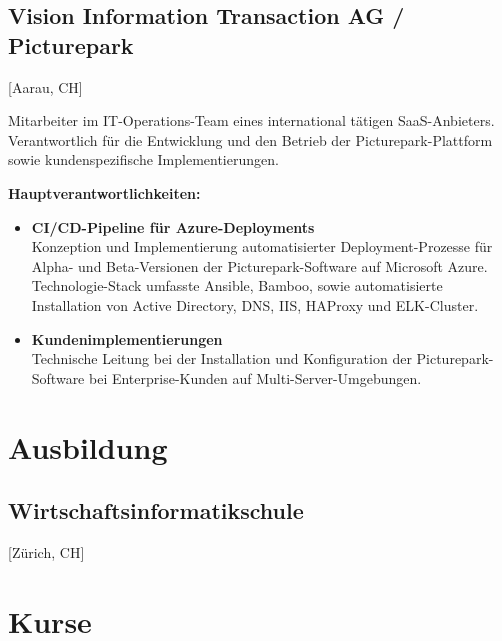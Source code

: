 \documentclass{cv}
\begin{document}
\subsection{Vision Information Transaction AG / Picturepark}[Aarau, CH]
\begin{positions}
\end{positions}
Mitarbeiter im IT-Operations-Team eines international tätigen SaaS-Anbieters. Verantwortlich für die Entwicklung und den Betrieb der Picturepark-Plattform sowie kundenspezifische Implementierungen.

\textbf{Hauptverantwortlichkeiten:}

\begin{itemize}
    \item \textbf{CI/CD-Pipeline für Azure-Deployments}\\Konzeption und Implementierung automatisierter Deployment-Prozesse für Alpha- und Beta-Versionen der Picturepark-Software auf Microsoft Azure. Technologie-Stack umfasste Ansible, Bamboo, sowie automatisierte Installation von Active Directory, DNS, IIS, HAProxy und ELK-Cluster.
    \item \textbf{Kundenimplementierungen}\\Technische Leitung bei der Installation und Konfiguration der Picturepark-Software bei Enterprise-Kunden auf Multi-Server-Umgebungen.
\end{itemize}
\newpage
\section{Ausbildung}
\subsection{Wirtschaftsinformatikschule}[Zürich, CH]
\begin{positions}
\end{positions}

\section{Kurse}
\end{document}
